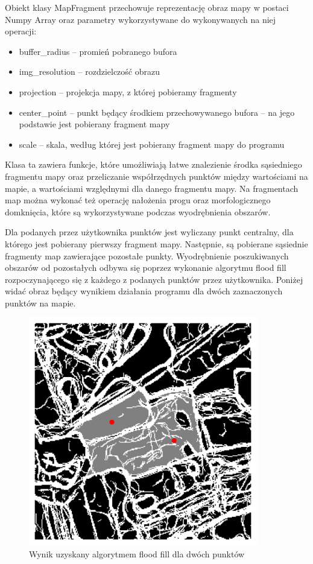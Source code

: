 Obiekt klasy MapFragment przechowuje reprezentację obraz mapy w postaci Numpy Array oraz parametry wykorzystywane do wykonywanych na niej operacji:

\begin{itemize}
    \item buffer\_radius -- promień pobranego bufora
    \item img\_resolution -- rozdzielczość obrazu
    \item projection -- projekcja mapy, z której pobieramy fragmenty
    \item center\_point -- punkt będący środkiem przechowywanego bufora -- na jego podstawie jest pobierany fragment mapy
    \item scale -- skala, według której jest pobierany fragment mapy do programu
\end{itemize}

Klasa ta zawiera funkcje, które umożliwiają łatwe znalezienie środka sąsiedniego fragmentu mapy oraz przeliczanie współrzędnych punktów między wartościami na mapie, a wartościami względnymi dla danego fragmentu mapy. Na fragmentach map można wykonać też operację nałożenia progu oraz morfologicznego domknięcia, które są wykorzystywane podczas wyodrębnienia obszarów.

Dla podanych przez użytkownika punktów jest wyliczany punkt centralny, dla którego jest pobierany pierwszy fragment mapy. Następnie, 
są pobierane sąsiednie fragmenty map zawierające pozostałe punkty. Wyodrębnienie poszukiwanych obszarów od pozostałych odbywa się poprzez wykonanie algorytmu flood fill rozpoczynającego się z każdego z podanych punktów przez użytkownika. Poniżej widać obraz będący wynikiem działania programu dla dwóch zaznaczonych punktów na mapie.

\begin{figure}[H]
    \centering
    \includegraphics[width=10cm]{images/Canny1.jpg}
    \caption{Wynik uzyskany algorytmem flood fill dla dwóch punktów}
\end{figure}

